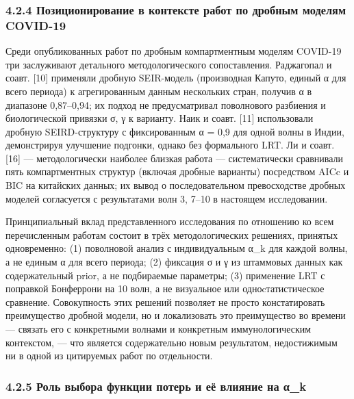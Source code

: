\documentclass[12pt]{article}
\begin{document}
\subsubsection{4.2.4 Позиционирование в контексте работ по дробным
моделям
COVID-19}\label{ux43fux43eux437ux438ux446ux438ux43eux43dux438ux440ux43eux432ux430ux43dux438ux435-ux432-ux43aux43eux43dux442ux435ux43aux441ux442ux435-ux440ux430ux431ux43eux442-ux43fux43e-ux434ux440ux43eux431ux43dux44bux43c-ux43cux43eux434ux435ux43bux44fux43c-covid-19}

Среди опубликованных работ по дробным компартментным моделям COVID-19
три заслуживают детального методологического сопоставления. Раджагопал и
соавт. {[}10{]} применяли дробную SEIR-модель (производная Капуто,
единый α для всего периода) к агрегированным данным нескольких стран,
получив α в диапазоне 0,87--0,94; их подход не предусматривал
поволнового разбиения и биологической привязки σ, γ к варианту. Наик и
соавт. {[}11{]} использовали дробную SEIRD-структуру с фиксированным α =
0,9 для одной волны в Индии, демонстрируя улучшение подгонки, однако без
формального LRT. Ли и соавт. {[}16{]} --- методологически наиболее
близкая работа --- систематически сравнивали пять компартментных
структур (включая дробные варианты) посредством AICc и BIC на китайских
данных; их вывод о последовательном превосходстве дробных моделей
согласуется с результатами волн 3, 7--10 в настоящем исследовании.

Принципиальный вклад представленного исследования по отношению ко всем
перечисленным работам состоит в трёх методологических решениях, принятых
одновременно: (1) поволновой анализ с индивидуальным α\_k для каждой
волны, а не единым α для всего периода; (2) фиксация σ и γ из штаммовых
данных как содержательный prior, а не подбираемые параметры; (3)
применение LRT с поправкой Бонферрони на 10 волн, а не визуальное или
одноcтатистическое сравнение. Совокупность этих решений позволяет не
просто констатировать преимущество дробной модели, но и локализовать это
преимущество во времени --- связать его с конкретными волнами и
конкретным иммунологическим контекстом, --- что является содержательно
новым результатом, недостижимым ни в одной из цитируемых работ по
отдельности.

\subsubsection{4.2.5 Роль выбора функции потерь и её влияние на
α\_k}\label{ux440ux43eux43bux44c-ux432ux44bux431ux43eux440ux430-ux444ux443ux43dux43aux446ux438ux438-ux43fux43eux442ux435ux440ux44c-ux438-ux435ux451-ux432ux43bux438ux44fux43dux438ux435-ux43dux430-ux3b1_k}
\end{document}
